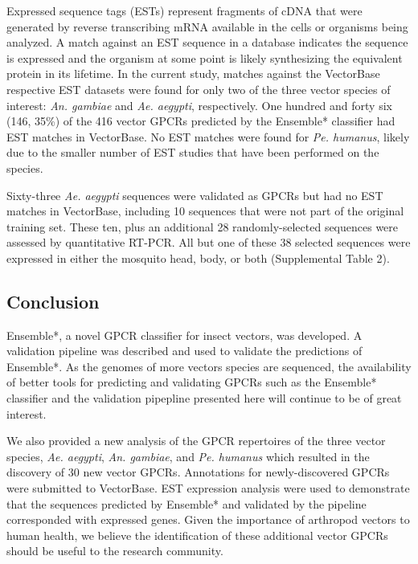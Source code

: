 Expressed sequence tags (ESTs) represent fragments of cDNA that were generated by reverse transcribing mRNA available in the cells or organisms being analyzed. A match against an EST sequence in a database indicates the sequence is expressed and the organism at some point is likely synthesizing the equivalent protein in its lifetime. In the current study, matches against the VectorBase respective EST datasets were found for only two of the three vector species of interest: \emph{An. gambiae} and \emph{Ae. aegypti}, respectively. One hundred and forty six (146, 35\%) of the 416 vector GPCRs predicted by the Ensemble* classifier had EST matches in VectorBase. No EST matches were found for \emph{Pe. humanus}, likely due to the smaller number of EST studies that have been performed on the species. 

Sixty-three \emph{Ae. aegypti} sequences were validated as GPCRs but had no EST matches in VectorBase, including 10 sequences that were not part of the original training set. These ten, plus an additional 28 randomly-selected sequences were assessed by quantitative RT-PCR.  All but one of these 38 selected sequences were expressed in either the mosquito head, body, or both (Supplemental Table 2).   

\subsection{Conclusion}

Ensemble*, a novel GPCR classifier for insect vectors, was developed.  A validation pipeline was described and used to validate the predictions of Ensemble*.  As the genomes of more vectors species are sequenced, the availability of better tools for predicting and validating GPCRs such as the Ensemble* classifier and the validation pipepline presented here will continue to be of great interest.

We also provided a new analysis of the GPCR repertoires of the three vector species, \emph{Ae. aegypti}, \emph{An. gambiae}, and \emph{Pe. humanus} which resulted in the discovery of 30 new vector GPCRs.  Annotations for newly-discovered GPCRs were submitted to VectorBase.  EST expression analysis were used to demonstrate that the sequences predicted by Ensemble* and validated by the pipeline corresponded with expressed genes.  Given the importance of arthropod vectors to human health, we believe the identification of these additional vector GPCRs should be useful to the research community.  


\newpage

